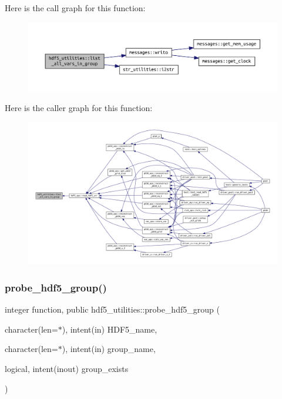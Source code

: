 Here is the call graph for this function\+:\nopagebreak
\begin{figure}[H]
\begin{center}
\leavevmode
\includegraphics[width=350pt]{namespacehdf5__utilities_aa9d76166f970a7052cd0d96c8f3ee0be_cgraph}
\end{center}
\end{figure}
Here is the caller graph for this function\+:\nopagebreak
\begin{figure}[H]
\begin{center}
\leavevmode
\includegraphics[width=350pt]{namespacehdf5__utilities_aa9d76166f970a7052cd0d96c8f3ee0be_icgraph}
\end{center}
\end{figure}
\mbox{\label{namespacehdf5__utilities_ae4e6c96512460a0ede8dc5b1a43681e8}} 
\subsubsection{\texorpdfstring{probe\+\_\+hdf5\+\_\+group()}{probe\_hdf5\_group()}}
{\footnotesize\ttfamily integer function, public hdf5\+\_\+utilities\+::probe\+\_\+hdf5\+\_\+group (\begin{DoxyParamCaption}\item[{character(len=$\ast$), intent(in)}]{H\+D\+F5\+\_\+name,  }\item[{character(len=$\ast$), intent(in)}]{group\+\_\+name,  }\item[{logical, intent(inout)}]{group\+\_\+exists }\end{DoxyParamCaption})}



